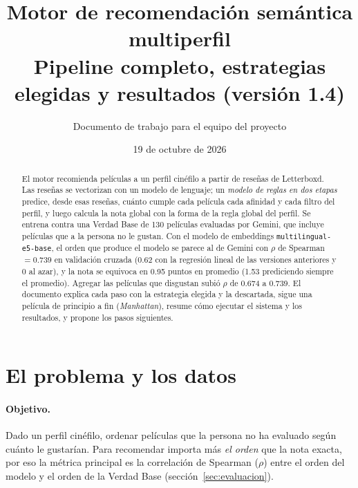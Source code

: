 \documentclass[11pt,a4paper]{article}
\title{\textbf{Motor de recomendación semántica multiperfil}\\[4pt]
\large Pipeline completo, estrategias elegidas y resultados (versión 1.4)}
\author{Documento de trabajo para el equipo del proyecto}
\date{19 de octubre de 2026}
\begin{document}
\maketitle

\begin{abstract}
\noindent El motor recomienda películas a un perfil cinéfilo a partir de reseñas de Letterboxd. Las reseñas se
vectorizan con un modelo de lenguaje; un \emph{modelo de reglas en dos etapas} predice, desde esas reseñas, cuánto
cumple cada película cada afinidad y cada filtro del perfil, y luego calcula la nota global con la forma de la regla
global del perfil. Se entrena contra una Verdad Base de 130 películas evaluadas por Gemini, que incluye películas
que a la persona no le gustan. Con el modelo de embeddings \texttt{multilingual-e5-base}, el orden que produce el modelo
se parece al de Gemini con $\rho$ de Spearman $=0.739$ en validación cruzada (0.62 con la regresión lineal de las
versiones anteriores y 0 al azar), y la nota se equivoca en 0.95 puntos en promedio (1.53 prediciendo siempre el
promedio). Agregar las películas que disgustan subió $\rho$ de 0.674 a 0.739. El documento explica cada paso con la estrategia elegida y la descartada, sigue una película de principio a
fin (\emph{Manhattan}), resume cómo ejecutar el sistema y los resultados, y propone los pasos siguientes.
\end{abstract}

\tableofcontents
\newpage

\section{El problema y los datos}

\paragraph{Objetivo.} Dado un perfil cinéfilo, ordenar películas que la persona no ha evaluado según cuánto le
gustarían. Para recomendar importa más \emph{el orden} que la nota exacta, por eso la métrica principal es la
correlación de Spearman ($\rho$) entre el orden del modelo y el orden de la Verdad Base (sección~\ref{sec:evaluacion}).
\end{document}

